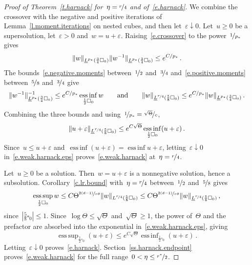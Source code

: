 \documentclass[11pt,letterpaper]{article}
\numberwithin{equation}{section}
\theoremstyle{definition}
\newcommand{\eps}{\varepsilon}
\newcommand{\nf}{\nicefrac}
\newcommand{\cu}{\square}
\DeclareMathOperator*{\esssup}{ess\,sup}
\DeclareMathOperator*{\essinf}{ess\,inf}
\DeclarePairedDelimiter{\norm}{\lVert}{\rVert}
\begin{document}
\begin{proof}[Proof of Theorem~\ref{t.harnack} for~$\eta=\nf r4$ and of~\eqref{e.harnack}]
We combine the crossover with the negative and positive iterations of Lemma~\ref{l.moment.iterations} on nested cubes, and then let~$\eps\downarrow0$. Let~$u\geq0$ be a supersolution, let~$\eps>0$ and~$w=u+\eps$. Raising~\eqref{e.crossover} to the power~$\nf1{p_*}$ gives
\begin{equation*}
	\norm{w}_{\underline L^{p_*}(\frac34\cu_0)}\norm{w^{-1}}_{\underline L^{p_*}(\frac34\cu_0)}\leq e^{C/p_*}\,.
\end{equation*} The bounds~\eqref{e.negative.moments} between~$\nf12$ and~$\nf34$ and~\eqref{e.positive.moments} between~$\nf58$ and~$\nf34$ give
\begin{equation*}
	\norm{w^{-1}}_{\underline L^{p_*}(\frac34\cu_0)}^{-1}\leq e^{C/p_*}\essinf_{\frac12\cu_0}w\qquad\mbox{and}\qquad\norm{w}_{\underline L^{\nf r4}(\frac58\cu_0)}\leq e^{C/p_*}\norm{w}_{\underline L^{p_*}(\frac34\cu_0)}\,.
\end{equation*}
Combining the three bounds and using~$\nf1{p_*}=\nf{\sqrt\Theta}c$,
\begin{equation}
	\norm{u+\eps}_{\underline L^{\nf r4}(\frac58\cu_0)}\leq e^{C\sqrt\Theta}\essinf_{\frac12\cu_0}(u+\eps)\,.
	\label{e.weak.harnack.eps}
\end{equation}
Since~$u\leq u+\eps$ and~$\essinf(u+\eps)=\essinf u+\eps$, letting~$\eps\downarrow0$ in~\eqref{e.weak.harnack.eps} proves~\eqref{e.weak.harnack} at~$\eta=\nf r4$.

\smallskip

Let~$u\geq0$ be a solution. Then~$w=u+\eps$ is a nonnegative solution, hence a subsolution. Corollary~\ref{c.lr.bound} with~$\eta=\nf r4$ between~$\nf12$ and~$\nf58$ gives
\begin{equation*}
	\esssup_{\frac12\cu_0}w\leq C\Theta^{\nf{2(d-1)}{r\theta}}\norm{w}_{L^{\nf r4}(\frac58\cu_0)}\leq C\Theta^{\nf{2(d-1)}{r\theta}}\norm{w}_{\underline L^{\nf r4}(\frac58\cu_0)}\,,
\end{equation*}
since~$|\frac58\cu_0|\leq1$. Since~$\log\Theta\leq\sqrt\Theta$ and~$\sqrt\Theta\geq1$, the power of~$\Theta$ and the prefactor are absorbed into the exponential in~\eqref{e.weak.harnack.eps}, giving
\begin{equation*}
	\esssup_{\frac12\cu_0}(u+\eps)\leq e^{C\sqrt\Theta}\essinf_{\frac12\cu_0}(u+\eps)\,.
\end{equation*}
Letting~$\eps\downarrow0$ proves~\eqref{e.harnack}. Section~\ref{ss.harnack.endpoint} proves~\eqref{e.weak.harnack} for the full range~$0<\eta\leq\nf{r^*}2$.
\end{proof}
\end{document}
